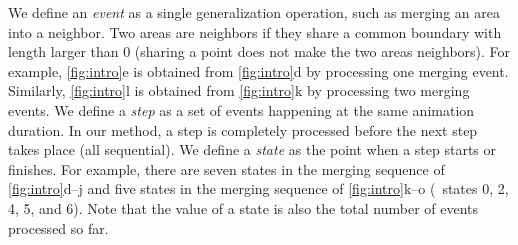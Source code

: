 \documentclass[]{interact}
\begin{document}



We define an \emph{event} as a single generalization operation, 
such as merging an area into a neighbor.
Two areas are neighbors if they share a common boundary with length larger than 0
(sharing a point does not make the two areas neighbors).
For example, \fig\ref{fig:intro}e is obtained from 
\fig\ref{fig:intro}d by processing one merging event.
Similarly, \fig\ref{fig:intro}l is obtained from 
\fig\ref{fig:intro}k by processing two merging events.
We define a \emph{step} as 
a set of events happening at the same animation duration.
In our method, a step is completely processed 
before the next step takes place (all sequential).
We define a \emph{state} as the point when a step starts or finishes.
For example, there are seven states 
in the merging sequence of \figs\ref{fig:intro}d--j
and five states in the merging sequence of \figs\ref{fig:intro}k--o 
(\ie~states 0, 2, 4, 5, and 6).
Note that the value of a state is also 
the total number of events processed so far.
\end{document}
